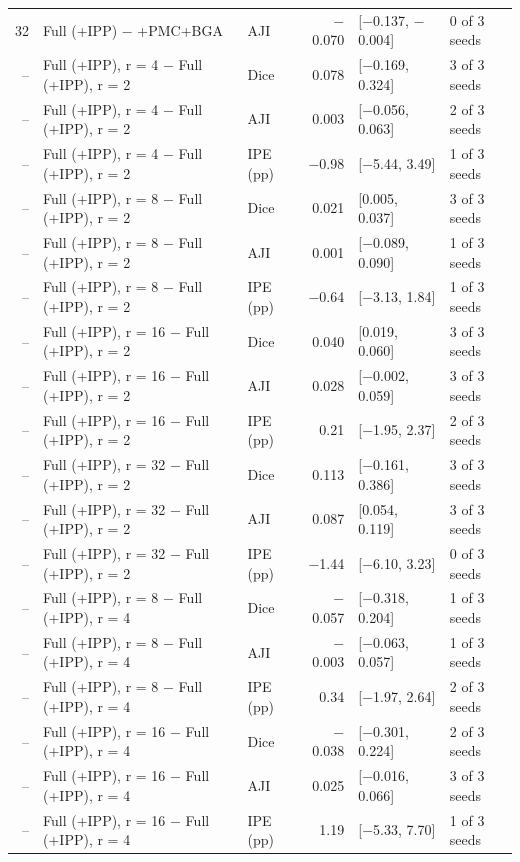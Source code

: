 \documentclass[10pt]{article}
\begin{document}
\begin{landscape}
{\begin{longtable}{r l l r l l}
32 & Full (+IPP) $-$ +PMC+BGA & AJI & $-$0.070 & [$-$0.137, $-$0.004] & 0 of 3 seeds \\
-- & Full (+IPP), r = 4 $-$ Full (+IPP), r = 2 & Dice & 0.078 & [$-$0.169, 0.324] & 3 of 3 seeds \\
-- & Full (+IPP), r = 4 $-$ Full (+IPP), r = 2 & AJI & 0.003 & [$-$0.056, 0.063] & 2 of 3 seeds \\
-- & Full (+IPP), r = 4 $-$ Full (+IPP), r = 2 & IPE (pp) & $-$0.98 & [$-$5.44, 3.49] & 1 of 3 seeds \\
-- & Full (+IPP), r = 8 $-$ Full (+IPP), r = 2 & Dice & 0.021 & [0.005, 0.037] & 3 of 3 seeds \\
-- & Full (+IPP), r = 8 $-$ Full (+IPP), r = 2 & AJI & 0.001 & [$-$0.089, 0.090] & 1 of 3 seeds \\
-- & Full (+IPP), r = 8 $-$ Full (+IPP), r = 2 & IPE (pp) & $-$0.64 & [$-$3.13, 1.84] & 1 of 3 seeds \\
-- & Full (+IPP), r = 16 $-$ Full (+IPP), r = 2 & Dice & 0.040 & [0.019, 0.060] & 3 of 3 seeds \\
-- & Full (+IPP), r = 16 $-$ Full (+IPP), r = 2 & AJI & 0.028 & [$-$0.002, 0.059] & 3 of 3 seeds \\
-- & Full (+IPP), r = 16 $-$ Full (+IPP), r = 2 & IPE (pp) & 0.21 & [$-$1.95, 2.37] & 2 of 3 seeds \\
-- & Full (+IPP), r = 32 $-$ Full (+IPP), r = 2 & Dice & 0.113 & [$-$0.161, 0.386] & 3 of 3 seeds \\
-- & Full (+IPP), r = 32 $-$ Full (+IPP), r = 2 & AJI & 0.087 & [0.054, 0.119] & 3 of 3 seeds \\
-- & Full (+IPP), r = 32 $-$ Full (+IPP), r = 2 & IPE (pp) & $-$1.44 & [$-$6.10, 3.23] & 0 of 3 seeds \\
-- & Full (+IPP), r = 8 $-$ Full (+IPP), r = 4 & Dice & $-$0.057 & [$-$0.318, 0.204] & 1 of 3 seeds \\
-- & Full (+IPP), r = 8 $-$ Full (+IPP), r = 4 & AJI & $-$0.003 & [$-$0.063, 0.057] & 1 of 3 seeds \\
-- & Full (+IPP), r = 8 $-$ Full (+IPP), r = 4 & IPE (pp) & 0.34 & [$-$1.97, 2.64] & 2 of 3 seeds \\
-- & Full (+IPP), r = 16 $-$ Full (+IPP), r = 4 & Dice & $-$0.038 & [$-$0.301, 0.224] & 2 of 3 seeds \\
-- & Full (+IPP), r = 16 $-$ Full (+IPP), r = 4 & AJI & 0.025 & [$-$0.016, 0.066] & 3 of 3 seeds \\
-- & Full (+IPP), r = 16 $-$ Full (+IPP), r = 4 & IPE (pp) & 1.19 & [$-$5.33, 7.70] & 1 of 3 seeds \\

\end{longtable}}
\end{landscape}
\end{document}
